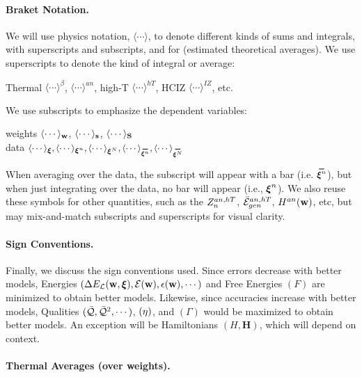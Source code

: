{\paragraph{Braket Notation.}
We will use physics \BraKet notation, $\langle\cdots\rangle$,
to denote different kinds of sums and integrals, with superscripts and subscripts,
and for \ExpectedValues (estimated theoretical averages).
We use superscripts to denote the kind of integral or average:
\begin{center}
Thermal $\langle\cdots\rangle^{\beta}$,
\Annealed $\langle\cdots\rangle^{an}$,
high-T $\langle\cdots\rangle^{hT}$,
HCIZ $\langle\cdots\rangle^{IZ}$, etc.
\end{center}
We use subscripts to emphasize the dependent variables:
\begin{center}
  weights $\langle\cdots\rangle_{{\mathbf{w}}}$, $\langle\cdots\rangle_{{\mathbf{s}}}$, $\langle\cdots\rangle_{{\mathbf{S}}}$ \\ \nonumber
    \vspace{0.33cm}  %
data $\langle\cdots\rangle_{\XI},
\langle\cdots\rangle_{\NDXIn},
\langle\cdots\rangle_{\NDXI},
\langle\cdots\rangle_{\AVGNDXIn},
\langle\cdots\rangle_{\AVGNDXI}$
\end{center}
When averaging over the data, the subscript will appear with a bar (i.e. $\AVGNDXIn$), but when just integrating over the data, no bar will appear (i.e., $\boldsymbol{\xi}^{n}$). 
We also reuse these symbols for other quantities, such as the $Z^{an,hT}_{n}$, $\bar{\mathcal{E}}_{gen}^{an,hT}$, $H^{an}({\mathbf{w}})$, etc,
but may mix-and-match subscripts and superscripts for visual clarity.

\paragraph{Sign Conventions.}
Finally, we discuss the sign conventions used.  Since errors decrease with better models,
Energies $(\Delta E_{\mathcal{L}}(\mathbf{w},\boldsymbol{\xi}), \mathcal{E}(\mathbf{w}), \epsilon({\mathbf{w}}), \cdots)$ and Free Energies $(F)$ are minimized to obtain better models.
Likewise, since accuracies increase with better models, Qualities $(\bar{\mathcal{Q}}, \bar{\mathcal{Q}}^{2}, \cdots)$,
\SelfOverlap $(\eta)$, and \Quality \GeneratingFunction $(\Gamma)$ would be maximized to obtain better models.
An exception will be Hamiltonians $(H,\mathbf{H})$, which will depend on context.

\paragraph{Thermal Averages (over weights).}

}
